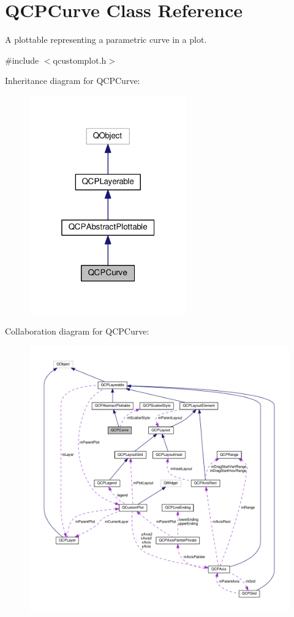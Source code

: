 \hypertarget{classQCPCurve}{}\section{Q\+C\+P\+Curve Class Reference}
\label{classQCPCurve}


A plottable representing a parametric curve in a plot.  




{\ttfamily \#include $<$qcustomplot.\+h$>$}



Inheritance diagram for Q\+C\+P\+Curve\+:\nopagebreak
\begin{figure}[H]
\begin{center}
\leavevmode
\includegraphics[width=193pt]{classQCPCurve__inherit__graph}
\end{center}
\end{figure}


Collaboration diagram for Q\+C\+P\+Curve\+:\nopagebreak
\begin{figure}[H]
\begin{center}
\leavevmode
\includegraphics[width=350pt]{classQCPCurve__coll__graph}
\end{center}
\end{figure}
